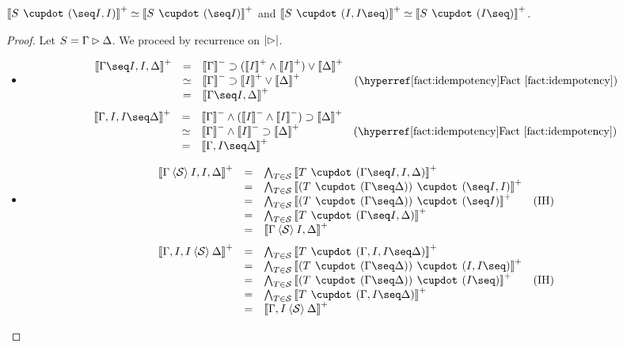 \begin{lemma}
  $\psint{S \mix (\seq I, I)} \semequiv \psint{S \mix (\seq I)}$ and
  $\psint{S \mix (I, I \seq)} \semequiv \psint{S \mix (I \seq)}$.
\end{lemma}
\begin{proof}
  Let $S = \Gamma \mathbin{\rhd} \Delta$. We proceed by recurrence on $\left|\mathbin{\rhd}\right|$.
  \begin{itemize}
    \item[\bcase]
    $$
    \begin{array}{rcll}
      \psint{\Gamma \seq I, I, \Delta}
      &=& \nsint{\Gamma} \limp (\psint{I} \land \psint{I}) \vee \psint{\Delta} & \\
      &\semequiv& \nsint{\Gamma} \limp \psint{I} \vee \psint{\Delta} &\text{(\reffact{idempotency})} \\
      &=& \psint{\Gamma \seq I, \Delta} & \\
    \end{array}
    $$
    $$
    \begin{array}{rcll}
      \psint{\Gamma, I, I \seq \Delta}
      &=& \nsint{\Gamma} \land (\nsint{I} \land \nsint{I}) \limp \psint{\Delta} & \\
      &\semequiv& \nsint{\Gamma} \land \nsint{I} \limp \psint{\Delta} &\text{(\reffact{idempotency})} \\
      &=& \psint{\Gamma, I \seq \Delta} & \\
    \end{array}
    $$
    \item[\rcase]
    $$
    \begin{array}{rcll}
      \psint{\Gamma \piq{\cS} I, I, \Delta}
      &=& \bigwedge_{T \in \cS}{\psint{T \mix (\Gamma \seq I, I, \Delta)}} & \\
      &=& \bigwedge_{T \in \cS}{\psint{(T \mix (\Gamma \seq \Delta)) \mix (\seq I, I)}} & \\
      &=& \bigwedge_{T \in \cS}{\psint{(T \mix (\Gamma \seq \Delta)) \mix (\seq I)}} &\text{(IH)} \\
      &=& \bigwedge_{T \in \cS}{\psint{T \mix (\Gamma \seq I, \Delta)}} & \\
      &=& \psint{\Gamma \piq{\cS} I, \Delta} & \\
    \end{array}
    $$
    $$
    \begin{array}{rcll}
      \psint{\Gamma, I, I \piq{\cS} \Delta}
      &=& \bigwedge_{T \in \cS}{\psint{T \mix (\Gamma, I, I \seq \Delta)}} & \\
      &=& \bigwedge_{T \in \cS}{\psint{(T \mix (\Gamma \seq \Delta)) \mix (I, I \seq)}} & \\
      &=& \bigwedge_{T \in \cS}{\psint{(T \mix (\Gamma \seq \Delta)) \mix (I \seq)}} &\text{(IH)} \\
      &=& \bigwedge_{T \in \cS}{\psint{T \mix (\Gamma, I \seq \Delta)}} & \\
      &=& \psint{\Gamma, I \piq{\cS} \Delta} & \\
    \end{array}
    $$
  \end{itemize}
\end{proof}

